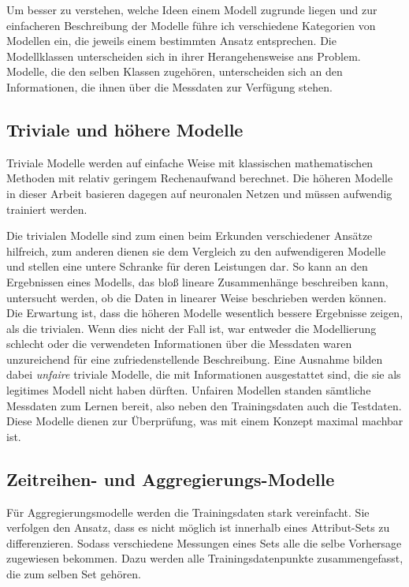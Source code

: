\documentclass[
	12pt,
	a4paper,
	BCOR10mm,
	DIV14,
	listof=totoc,
	bibliography=totoc,
	headsepline
]{scrreprt}
\begin{document}
Um besser zu verstehen, welche Ideen einem Modell zugrunde liegen und zur einfacheren Beschreibung der Modelle führe ich verschiedene Kategorien von Modellen ein, die jeweils einem bestimmten Ansatz entsprechen.
Die Modellklassen unterscheiden sich in ihrer Herangehensweise ans Problem. Modelle, die den selben Klassen zugehören, unterscheiden sich an den Informationen, die ihnen über die Messdaten zur Verfügung stehen.

\subsection{Triviale und höhere Modelle}
Triviale Modelle werden auf einfache Weise mit klassischen mathematischen Methoden mit relativ geringem Rechenaufwand berechnet.
Die höheren Modelle in dieser Arbeit basieren dagegen auf neuronalen Netzen und müssen aufwendig trainiert werden.

Die trivialen Modelle sind zum einen beim Erkunden verschiedener Ansätze hilfreich, zum anderen dienen sie dem Vergleich zu den aufwendigeren Modelle und stellen eine untere Schranke für deren Leistungen dar.
So kann an den Ergebnissen eines Modells, das bloß lineare Zusammenhänge beschreiben kann, untersucht werden, ob die Daten in linearer Weise beschrieben werden können. Die Erwartung ist, dass die höheren Modelle wesentlich bessere Ergebnisse zeigen, als die trivialen. Wenn dies nicht der Fall ist, war entweder die Modellierung schlecht oder die verwendeten Informationen über die Messdaten waren unzureichend für eine zufriedenstellende Beschreibung.
Eine Ausnahme bilden dabei \textit{unfaire} triviale Modelle, die mit Informationen ausgestattet sind, die sie als legitimes Modell nicht haben dürften. Unfairen Modellen standen sämtliche Messdaten zum Lernen bereit, also neben den Trainingsdaten auch die Testdaten. Diese Modelle dienen zur Überprüfung, was mit einem Konzept maximal machbar ist.

\subsection{Zeitreihen- und Aggregierungs-Modelle}
Für Aggregierungsmodelle werden die Trainingsdaten stark vereinfacht. Sie verfolgen den Ansatz, dass es nicht möglich ist innerhalb eines Attribut-Sets zu differenzieren. Sodass verschiedene Messungen eines Sets alle die selbe Vorhersage zugewiesen bekommen. Dazu werden alle Trainingsdatenpunkte zusammengefasst, die zum selben Set gehören.
\end{document}
